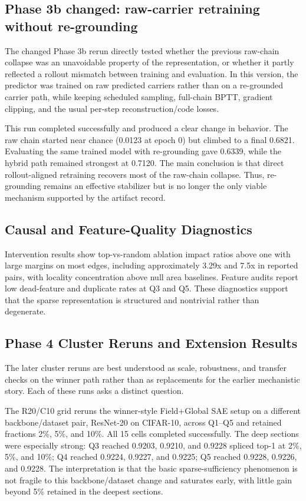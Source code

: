 \documentclass[11pt]{article}
\begin{document}
\subsection{Phase 3b changed: raw-carrier retraining without re-grounding}
The changed Phase 3b rerun directly tested whether the previous raw-chain collapse was an unavoidable property of the representation, or whether it partly reflected a rollout mismatch between training and evaluation. In this version, the predictor was trained on raw predicted carriers rather than on a re-grounded carrier path, while keeping scheduled sampling, full-chain BPTT, gradient clipping, and the usual per-step reconstruction/code losses.

This run completed successfully and produced a clear change in behavior. The raw chain started near chance (0.0123 at epoch 0) but climbed to a final 0.6821. Evaluating the same trained model with re-grounding gave 0.6339, while the hybrid path remained strongest at 0.7120. The main conclusion is that direct rollout-aligned retraining recovers most of the raw-chain collapse. Thus, re-grounding remains an effective stabilizer but is no longer the only viable mechanism supported by the artifact record.

\subsection{Causal and Feature-Quality Diagnostics}
Intervention results show top-vs-random ablation impact ratios above one with large margins on most edges, including approximately 3.29x and 7.5x in reported pairs, with locality concentration above null area baselines. Feature audits report low dead-feature and duplicate rates at Q3 and Q5. These diagnostics support that the sparse representation is structured and nontrivial rather than degenerate.

\subsection{Phase 4 Cluster Reruns and Extension Results}
The later cluster reruns are best understood as scale, robustness, and transfer checks on the winner path rather than as replacements for the earlier mechanistic story. Each of these runs asks a distinct question.

The R20/C10 grid reruns the winner-style Field+Global SAE setup on a different backbone/dataset pair, ResNet-20 on CIFAR-10, across Q1--Q5 and retained fractions 2\%, 5\%, and 10\%. All 15 cells completed successfully. The deep sections were especially strong: Q3 reached 0.9203, 0.9210, and 0.9228 spliced top-1 at 2\%, 5\%, and 10\%; Q4 reached 0.9224, 0.9227, and 0.9225; Q5 reached 0.9228, 0.9226, and 0.9228. The interpretation is that the basic sparse-sufficiency phenomenon is not fragile to this backbone/dataset change and saturates early, with little gain beyond 5\% retained in the deepest sections.
\end{document}
